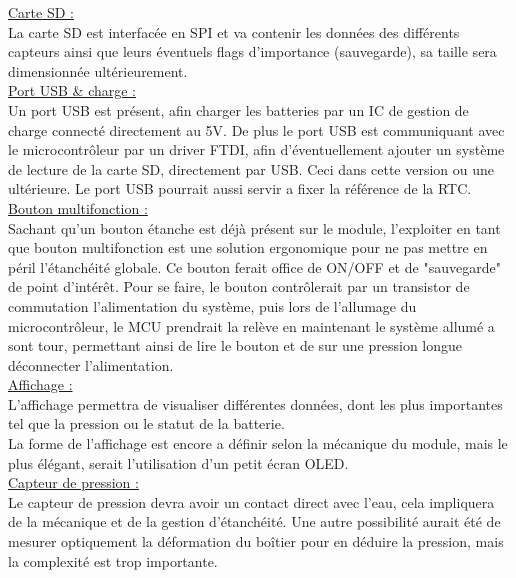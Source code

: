 {\underline{Carte SD :}
\\ La carte SD est interfacée en SPI et va contenir les données des différents capteurs ainsi que leurs éventuels flags d'importance (sauvegarde), sa taille sera dimensionnée ultérieurement.\\

\underline{Port USB \& charge :}
\\ Un port USB est présent, afin charger les batteries par un IC de gestion de charge connecté directement au 5V. De plus le port USB est communiquant avec le microcontrôleur par un driver FTDI, afin d'éventuellement ajouter un système de lecture de la carte SD, directement par USB. Ceci dans cette version ou une ultérieure. Le port USB pourrait aussi servir a fixer la référence de la RTC. \\

\underline{Bouton multifonction :}
\\ Sachant qu'un bouton étanche est déjà présent sur le module, l'exploiter en tant que bouton multifonction est une solution ergonomique pour ne pas mettre en péril l'étanchéité globale. Ce bouton ferait office de ON/OFF et de "sauvegarde" de point d'intérêt. Pour se faire, le bouton contrôlerait par un transistor de commutation l'alimentation du système, puis lors de l'allumage du microcontrôleur, le MCU prendrait la relève en maintenant le système allumé a sont tour, permettant ainsi de lire le bouton et de sur une pression longue déconnecter l'alimentation.\\

\underline{Affichage :}
\\ L'affichage permettra de visualiser différentes données, dont les plus importantes tel que la pression ou le statut de la batterie. \\ La forme de l'affichage est encore a définir selon la mécanique du module, mais le plus élégant, serait l'utilisation d'un petit écran OLED.\\

\underline{Capteur de pression :}
\\ Le capteur de pression devra avoir un contact direct avec l'eau, cela impliquera de la mécanique et de la gestion d'étanchéité. Une autre possibilité aurait été de mesurer optiquement la déformation du boîtier pour en déduire la pression, mais la complexité est trop importante.\\
}

\clearpage

